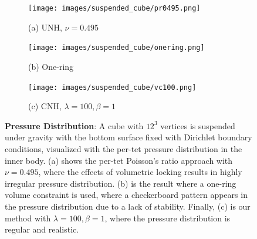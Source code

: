 \begin{figure}
	\centering
	\begin{subfigure}{.32\linewidth}
		\centering
		{\texttt{[image: images/suspended\_cube/pr0495.png]}}
		\caption*{(a) UNH, $\nu = 0.495$}
		\label{sfig:suspended-cube-pr-0495}
	\end{subfigure}%
	\begin{subfigure}{.32\linewidth}
		\centering
		{\texttt{[image: images/suspended\_cube/onering.png]}}
		\caption*{(b) One-ring}
		\label{sfig:suspended-cube-onering}
	\end{subfigure}%
	\begin{subfigure}{.32\linewidth}
		\centering
		{\texttt{[image: images/suspended\_cube/vc100.png]}}
		\caption*{(c) CNH, $\lambda = 100, \beta = 1$}
		\label{sfig:suspended-cube-vc-100}
	\end{subfigure}%
	\caption{\textbf{Pressure Distribution}: A cube with $12^3$ vertices is suspended under gravity with the bottom surface fixed with Dirichlet boundary conditions, visualized with the per-tet pressure distribution in the inner body. (a) shows the per-tet Poisson's ratio approach with $\nu = 0.495$, where the effects of volumetric locking results in highly irregular pressure distribution. (b) is the result where a one-ring volume constraint is used, where a checkerboard pattern appears in the pressure distribution due to a lack of stability. Finally, (c) is our method with $\lambda = 100, \beta = 1$, where the pressure distribution is regular and realistic. }
	\label{fig:suspended-cubes}
\end{figure}


